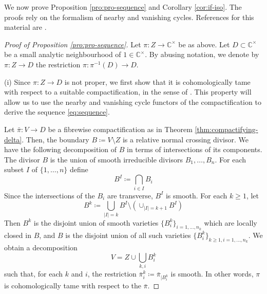 \documentclass[11pt, reqno]{amsart}
\theoremstyle{plain}
\theoremstyle{definition}
\newcommand{\CC}{\mathbb{C}}
\begin{document}
We now prove Proposition \ref{pro:pro-sequence} and Corollary \ref{cor:if-iso}. The proofs rely on the formalism of nearby and vanishing cycles. References for this material are \cite{DeligneKatz, Dimca, Sawin, ML, Massey}.

\begin{proof}[Proof of Proposition \ref{pro:pro-sequence}]
Let $\pi \colon Z \to \CC^\times$ be as above. 
Let $D \subset \CC^\times$ be a small analytic neighbourhood of $1 \in \CC^\times$. By abusing notation, we denote by $\pi \colon Z \to D$ the restriction $\pi \colon \pi^{-1}(D) \to D$. 

(i) Since $\pi\colon Z \to D$ is not proper, we first show that it is cohomologically tame with respect to a suitable compactification, in the sense of \cite[Definition 6.2.12]{Dimca}. This property will allow us to use the nearby and vanishing cycle functors of the compactification to derive the sequence \eqref{eq:sequence}.

Let $\bar{\pi} \colon V \to D$ be a fibrewise compactification as in Theorem \ref{thm:compactifying-delta}. Then, the boundary $B\coloneqq V \setminus Z$ is a relative normal crossing divisor. 
We have the following decomposition of $B$ in terms of intersections of its components.
The divisor $B$ is the union of smooth irreducible divisors $B_1, \dots, B_n$. For each subset $I$ of $\{1, \dots, n\}$ define 
\[
B^I \coloneqq \bigcap_{i \in I} B_i
\] Since the intersections of the $B_i$ are transverse, $B^I$ is smooth. 
For each $k \geq 1$, let \[B^k \coloneqq \bigcup_{|I|=k} B^I \setminus \left( \cup_{|I|=k+1} B^I\right) \]
Then $B^k$ is the disjoint union of smooth varieties 
$\{B^k_i\}_{i=1, \dots, n_k}$ which are locally closed in $B$,
and $B$ is the disjoint union of all such varieties
$\{B^k_i\}_{k \geq 1, i=1, \dots, n_k}$.
We obtain a decomposition 
\[ V= Z \cup \bigcup_{k,i} B^k_i
\]
such that, for each $k$ and $i$, the restriction $\bar{\pi}^k_i \coloneqq \bar{\pi}_{|B^k_i}$ is smooth. 
In other words, $\pi$ is cohomologically tame with respect to the $\bar{\pi}$. 


\end{proof}
\end{document}
